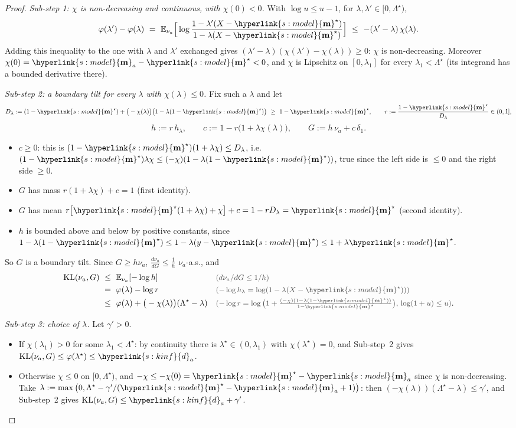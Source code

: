\documentclass[10pt]{article}
\newcommand{\sy}[2]{{\hyperlink{#1}{#2}}}
\newcommand{\E}{\mathbb{E}}
\newcommand{\1}{\mathbf{1}}
\newcommand{\KL}{\mathrm{KL}}
\newcommand{\m}{\sy{s:model}{\mathbf{m}}}
\newcommand{\da}{\sy{s:kinf}{d}_a}
\newcommand{\why}[1]{\text{\small\color{black!70}(#1)}}
\begin{document}
\begin{proof}
\noindent\emph{Sub-step 1: $\chi$ is non-decreasing and continuous, with $\chi(0)<0$.} With $\log u\le u-1$, for $\lambda,\lambda'\in[0,\Lambda^\star)$,
\[
\varphi(\lambda')-\varphi(\lambda)\ =\ \E_{\nu_a}\Big[\log\frac{1-\lambda'(X-\m^\star)}{1-\lambda(X-\m^\star)}\Big]\ \le\ -(\lambda'-\lambda)\,\chi(\lambda).
\]
Adding this inequality to the one with $\lambda$ and $\lambda'$ exchanged gives $(\lambda'-\lambda)(\chi(\lambda')-\chi(\lambda))\ge0$: $\chi$ is non-decreasing. Moreover
$\chi(0)=\m_a-\m^\star<0$, and $\chi$ is Lipschitz on $[0,\lambda_1]$ for every $\lambda_1<\Lambda^\star$ (its integrand has a bounded derivative there).

\noindent\emph{Sub-step 2: a boundary tilt for every $\lambda$ with $\chi(\lambda)\le0$.} Fix such a $\lambda$ and let
\[
D_\lambda:=(1-\m^\star)+\big(-\chi(\lambda)\big)\big(1-\lambda(1-\m^\star)\big)\ \ge\ 1-\m^\star,\qquad r:=\frac{1-\m^\star}{D_\lambda}\in(0,1],
\]
\[
h:=r\,h_\lambda,\qquad c:=1-r\big(1+\lambda\chi(\lambda)\big),\qquad G:=h\,\nu_a+c\,\delta_1 .
\]
\begin{itemize}
\item $c\ge0$: this is $(1-\m^\star)(1+\lambda\chi)\le D_\lambda$, i.e.\ $(1-\m^\star)\lambda\chi\le(-\chi)(1-\lambda(1-\m^\star))$, true since the left side is $\le0$ and the
right side $\ge0$.
\item $G$ has mass $r(1+\lambda\chi)+c=1$ (first identity).
\item $G$ has mean $r\big[\m^\star(1+\lambda\chi)+\chi\big]+c=1-rD_\lambda=\m^\star$ (second identity).
\item $h$ is bounded above and below by positive constants, since $1-\lambda(1-\m^\star)\le1-\lambda(y-\m^\star)\le1+\lambda\m^\star$.
\end{itemize}
So $G$ is a boundary tilt. Since $G\ge h\nu_a$, $\frac{d\nu_a}{dG}\le\frac1h$ $\nu_a$-a.s., and
\begin{align*}
\KL(\nu_a,G)\ &\le\ \E_{\nu_a}[-\log h]&&\why{$d\nu_a/dG\le1/h$}\\
&=\ \varphi(\lambda)-\log r&&\why{$-\log h_\lambda=\log(1-\lambda(X-\m^\star))$}\\
&\le\ \varphi(\lambda)+\big(-\chi(\lambda)\big)(\Lambda^\star-\lambda)&&\why{$-\log r=\log\big(1+\tfrac{(-\chi)(1-\lambda(1-\m^\star))}{1-\m^\star}\big)$, $\log(1+u)\le u$}.
\end{align*}

\noindent\emph{Sub-step 3: choice of $\lambda$.} Let $\gamma'>0$.
\begin{itemize}
\item If $\chi(\lambda_1)>0$ for some $\lambda_1<\Lambda^\star$: by continuity there is $\lambda^\star\in(0,\lambda_1)$ with $\chi(\lambda^\star)=0$, and Sub-step~2 gives
$\KL(\nu_a,G)\le\varphi(\lambda^\star)\le\da$.
\item Otherwise $\chi\le0$ on $[0,\Lambda^\star)$, and $-\chi\le-\chi(0)=\m^\star-\m_a$ since $\chi$ is non-decreasing. Take $\lambda:=\max\big(0,\Lambda^\star-\gamma'/(\m^\star-\m_a+1)\big)$:
then $(-\chi(\lambda))(\Lambda^\star-\lambda)\le\gamma'$, and Sub-step~2 gives $\KL(\nu_a,G)\le\da+\gamma'$.
\end{itemize}
\end{proof}
\end{document}
